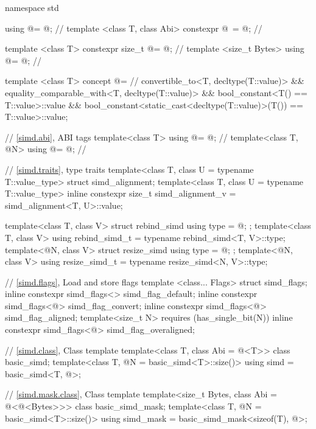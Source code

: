 \begin{codeblock}
namespace std {
  using @\simdsizetype@ = @\seebelow@; // \expos
  template <class T, class Abi> constexpr @\simdsizetype\ \simdsizev@ = @\seebelow@; // \expos

  template <class T> constexpr size_t @\maskelementsize@ = @\seebelow@; // \expos
  template <size_t Bytes> using @\integerfrom@ = @\seebelow@; // \expos

  template <class T>
    concept @\constexprwrapperlike@ =                     // \expos
      convertible_to<T, decltype(T::value)> &&
      equality_comparable_with<T, decltype(T::value)> &&
      bool_constant<T() == T::value>::value &&
      bool_constant<static_cast<decltype(T::value)>(T()) == T::value>::value;

  // \ref{simd.abi},  ABI tags
  template<class T> using @\nativeabi@ = @\seebelow@; // \expos
  template<class T, @\simdsizetype@ N> using @\deducet@ = @\seebelow@; // \expos

  // \ref{simd.traits},  type traits
  template<class T, class U = typename T::value_type> struct simd_alignment;
  template<class T, class U = typename T::value_type>
    inline constexpr size_t simd_alignment_v = simd_alignment<T, U>::value;

  template<class T, class V> struct rebind_simd { using type = @\seebelow@; };
  template<class T, class V> using rebind_simd_t = typename rebind_simd<T, V>::type;
  template<@\simdsizetype@ N, class V> struct resize_simd { using type = @\seebelow@; };
  template<@\simdsizetype@ N, class V> using resize_simd_t = typename resize_simd<N, V>::type;

  // \ref{simd.flags}, Load and store flags
  template <class... Flags> struct simd_flags;
  inline constexpr simd_flags<> simd_flag_default{};
  inline constexpr simd_flags<@\seebelow@> simd_flag_convert{};
  inline constexpr simd_flags<@\seebelow@> simd_flag_aligned{};
  template<size_t N> requires (has_single_bit(N))
    inline constexpr simd_flags<@\seebelow@> simd_flag_overaligned{};

  // \ref{simd.class}, Class template 
  template<class T, class Abi = @\nativeabi@<T>> class basic_simd;
  template<class T, @\simdsizetype@ N = basic_simd<T>::size()>
    using simd = basic_simd<T, @>;

  // \ref{simd.mask.class}, Class template 
  template<size_t Bytes, class Abi = @\nativeabi@<@\integerfrom@<Bytes>>> class basic_simd_mask;
  template<class T, @\simdsizetype@ N = basic_simd<T>::size()>
    using simd_mask = basic_simd_mask<sizeof(T), @>;

}
\end{codeblock}
